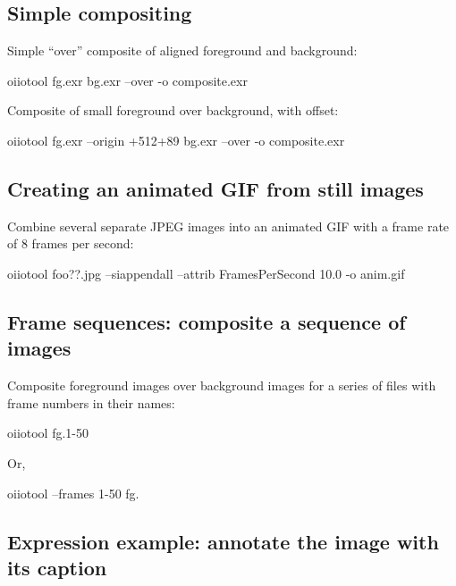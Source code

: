 \subsection*{Simple compositing}

\noindent Simple ``over'' composite of aligned foreground and background:

\begin{code}
    oiiotool fg.exr bg.exr --over -o composite.exr
\end{code}

\noindent Composite of small foreground over background, with offset:

\begin{code}
    oiiotool fg.exr --origin +512+89 bg.exr --over -o composite.exr
\end{code}


\subsection*{Creating an animated GIF from still images}
 

\noindent Combine several separate JPEG images into an animated GIF with
a frame rate of 8 frames per second:

\begin{code}
    oiiotool foo??.jpg --siappendall --attrib FramesPerSecond 10.0 -o anim.gif
\end{code}


\subsection*{Frame sequences: composite a sequence of images}

\noindent Composite foreground images over background images for a
series of files with frame numbers in their names:
\begin{code}
    oiiotool fg.1-50%
\end{code}

\noindent Or,
\begin{code}
    oiiotool --frames 1-50 fg.%
\end{code}


\subsection*{Expression example: annotate the image with its caption}

